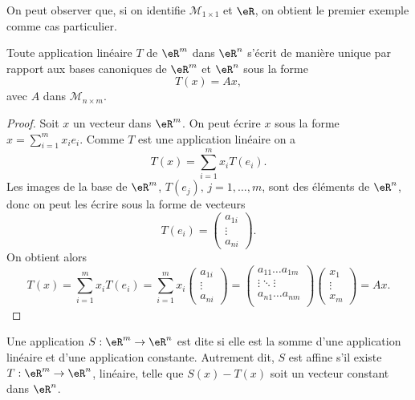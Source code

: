 On peut observer que, si on identifie $\mathcal{M}_{1\times 1}$ et $\eR$, on obtient le premier exemple comme cas particulier.

\begin{proposition}
 Toute application linéaire $T$ de $\eR^m$ dans $\eR^n$ s'écrit de manière unique par rapport aux bases canoniques de $\eR^m$ et $\eR^n$ sous la forme
\[
T(x)=Ax,
\]
avec $A$ dans $\mathcal{M}_{n\times m}$.
\end{proposition}

\begin{proof}
  Soit $x$ un vecteur dans $\eR^m$. On peut écrire $x$ sous la forme $ x=\sum_{i=1}^{m}x_i e_i$. Comme $T$ est une application linéaire on a
\[
T(x)=\sum_{i=1}^{m}x_iT(e_i).
\]
Les images de la base de $\eR^m$, $T(e_j), \, j=1,\ldots,m$, sont des éléments de $\eR^n$, donc on peut les écrire sous la forme de vecteurs
\[
T(e_i)=
\begin{pmatrix}
  a_{1i}\\
\vdots\\
a_{ni}
\end{pmatrix}.
\] 
On obtient alors
\[
T(x)=\sum_{i=1}^{m}x_iT(e_i)=\sum_{i=1}^{m}x_i\begin{pmatrix}
  a_{1i}\\
\vdots\\
a_{ni}
\end{pmatrix}=
\begin{pmatrix}
  a_{11} \ldots a_{1m}\\
\vdots \ddots \vdots\\
 a_{n1} \ldots a_{nm}\\
\end{pmatrix}
\begin{pmatrix}
  x_1\\
\vdots\\
x_m
\end{pmatrix}=Ax.
\]
\end{proof}


\begin{definition}
  Une application $S: \eR^m\to\eR^n$ est dite  si elle est la somme d'une application linéaire et d'une application constante. Autrement dit, $S$ est affine s'il existe $T: \eR^m\to\eR^n$, linéaire, telle que $S(x)-T(x)$ soit un vecteur constant dans $\eR^n$. 
\end{definition}

